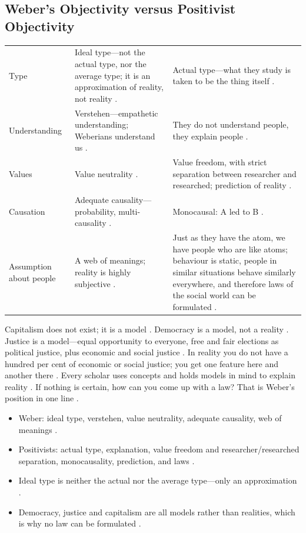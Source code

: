 \subsection{Weber's Objectivity versus Positivist Objectivity}
\vspace{6pt}
\noindent
\begin{tabularx}{\textwidth}{>{\hsize}Y >{\hsize}Y >{\hsize}Y}
\toprule
{}
 &  &  \\
\midrule
Type & Ideal type---not the actual type, nor the average type; it is an approximation of reality, not reality . & Actual type---what they study is taken to be the thing itself . \\
\midrule
Understanding & Verstehen---empathetic understanding; Weberians understand us . & They do not understand people, they explain people . \\
\midrule
Values & Value neutrality . & Value freedom, with strict separation between researcher and researched; prediction of reality . \\
\midrule
Causation & Adequate causality---probability, multi-causality . & Monocausal: A led to B . \\
\midrule
Assumption about people & A web of meanings; reality is highly subjective . & Just as they have the atom, we have people who are like atoms; behaviour is static, people in similar situations behave similarly everywhere, and therefore laws of the social world can be formulated . \\
\bottomrule
\end{tabularx}
\vspace{6pt}

\begin{KeyConcept}
Capitalism does not exist; it is a model . Democracy is a model, not a reality . Justice is a model---equal opportunity to everyone, free and fair elections as political justice, plus economic and social justice . In reality you do not have a hundred per cent of economic or social justice; you get one feature here and another there .
Every scholar uses concepts and holds models in mind to explain reality .
If nothing is certain, how can you come up with a law? That is Weber's position in one line .
\end{KeyConcept}

\begin{QuickRevision}
\begin{itemize}
    \item Weber: ideal type, verstehen, value neutrality, adequate causality, web of meanings .
    \item Positivists: actual type, explanation, value freedom and researcher/researched separation, monocausality, prediction, and laws .
    \item Ideal type is neither the actual nor the average type---only an approximation .
    \item Democracy, justice and capitalism are all models rather than realities, which is why no law can be formulated .
\end{itemize}
\end{QuickRevision}

